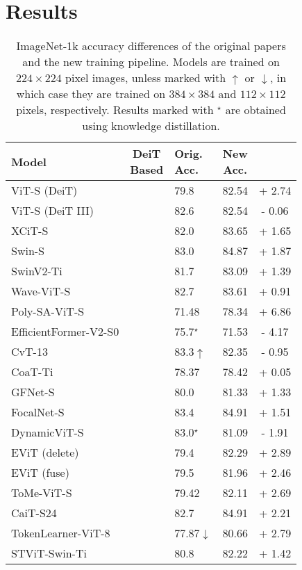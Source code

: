 
\section{Results}


\begin{table}
	\small
	\centering
	\begin{tabular}{l|cl|cc}
		Model & \makecell[c]{DeiT \\ Based} & \makecell[c]{Orig. \\ Acc.} & \makecell[c]{New \\ Acc.} & \makecell[c]{$\Delta$}\\
		\hline
		ViT-S (DeiT)            & \checkmark & 79.8  & 82.54 & + 2.74 \\
		ViT-S (DeiT III)        &            & 82.6  & 82.54 & - 0.06 \\
		XCiT-S                  & \checkmark & 82.0  & 83.65 & + 1.65 \\
		Swin-S                  & \checkmark & 83.0  & 84.87 & + 1.87 \\
		SwinV2-Ti               &            & 81.7  & 83.09 & + 1.39 \\
		Wave-ViT-S              &            & 82.7  & 83.61 & + 0.91 \\
		Poly-SA-ViT-S           &            & 71.48 & 78.34 & + 6.86 \\
		EfficientFormer-V2-S0   &            & 75.7${}^\star$ & 71.53 & - 4.17 \\
		CvT-13                  &            & 83.3$\uparrow$ & 82.35 &- 0.95\\
		CoaT-Ti                 & \checkmark & 78.37 &  78.42  & + 0.05 \\
		GFNet-S                 &            & 80.0  & 81.33 & + 1.33 \\
		FocalNet-S              &            & 83.4  & 84.91 & + 1.51 \\
		DynamicViT-S            &            & 83.0${}^\star$ & 81.09 & - 1.91 \\
		EViT (delete)           & \checkmark & 79.4  & 82.29 & + 2.89 \\
		EViT (fuse)             & \checkmark & 79.5  & 81.96 & + 2.46 \\
		ToMe-ViT-S              & \checkmark & 79.42 & 82.11 & + 2.69 \\
		CaiT-S24                & \checkmark & 82.7  & 84.91 & + 2.21 \\
		TokenLearner-ViT-8      &            & 77.87$\downarrow$ & 80.66 & + 2.79 \\
		STViT-Swin-Ti           & \checkmark & 80.8  & 82.22 & + 1.42 \\
	\end{tabular}
	\caption{ImageNet-1k accuracy differences of the original papers and the new training pipeline. 
		Models are trained on $224 \times 224$ pixel images, unless marked with $\uparrow$ or $\downarrow$, in which case they are trained on $384 \times 384$ and $112 \times 112$ pixels, respectively. Results marked with ${}^\star$ are obtained using knowledge distillation.}
	\label{table:pipeline_comparisons}
\end{table}


